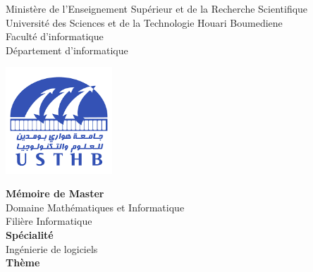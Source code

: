 \documentclass[12pt, a4paper]{report}
\begin{document}
\begin{center}
\normalsize{Ministère de l'Enseignement Supérieur et de la Recherche Scientifique}\\
\normalsize{Université des Sciences et de la Technologie Houari Boumediene}\\
\normalsize{Faculté d'informatique}\\
\normalsize{Département d'informatique}\\
\end{center}

\begin{center}
\includegraphics[width=4cm,height=4cm]{usthb.png}
\end{center}

\begin{center}
\Huge{\textbf{Mémoire de Master}}\\
\vspace{0.3cm}
\large{Domaine Mathématiques et Informatique}\\
\vspace{0.2cm}
\large{Filière Informatique}\\
\vspace{0.2cm}
\Huge{\textbf{Spécialité}}\\
\vspace{0.3cm}
\large{Ingénierie de logiciels}\\
\vspace{1.5cm}
\normalsize{\textbf{Thème}}
\end{center}
\end{document}

